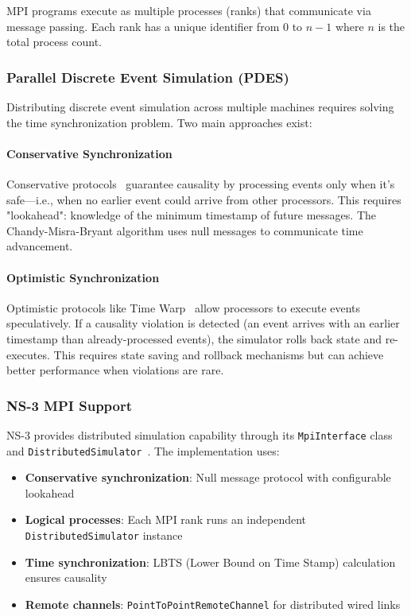 MPI programs execute as multiple processes (ranks) that communicate via message passing. Each rank has a unique identifier from 0 to $n-1$ where $n$ is the total process count.

\subsubsection{Parallel Discrete Event Simulation (PDES)}

Distributing discrete event simulation across multiple machines requires solving the time synchronization problem. Two main approaches exist:

\paragraph{Conservative Synchronization}
Conservative protocols~\cite{chandy-misra} guarantee causality by processing events only when it's safe—i.e., when no earlier event could arrive from other processors. This requires "lookahead": knowledge of the minimum timestamp of future messages. The Chandy-Misra-Bryant algorithm uses null messages to communicate time advancement.

\paragraph{Optimistic Synchronization}
Optimistic protocols like Time Warp~\cite{jefferson-timewarp} allow processors to execute events speculatively. If a causality violation is detected (an event arrives with an earlier timestamp than already-processed events), the simulator rolls back state and re-executes. This requires state saving and rollback mechanisms but can achieve better performance when violations are rare.

\subsubsection{NS-3 MPI Support}

NS-3 provides distributed simulation capability through its \texttt{MpiInterface} class and \texttt{DistributedSimulator}~\cite{ns3-mpi}. The implementation uses:

\begin{itemize}
    \item \textbf{Conservative synchronization}: Null message protocol with configurable lookahead
    \item \textbf{Logical processes}: Each MPI rank runs an independent \texttt{DistributedSimulator} instance
    \item \textbf{Time synchronization}: LBTS (Lower Bound on Time Stamp) calculation ensures causality
    \item \textbf{Remote channels}: \texttt{PointToPointRemoteChannel} for distributed wired links
\end{itemize}

